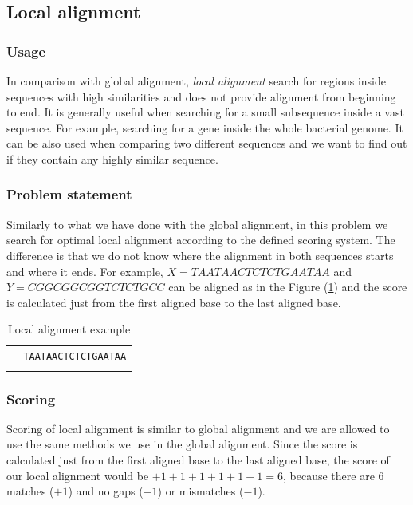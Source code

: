 \subsection{Local alignment}
\subsubsection{Usage}
In comparison with global alignment, \emph{local alignment} search for regions inside sequences with high similarities and does not provide alignment from beginning to end.
It is generally useful when searching for a small subsequence inside a vast sequence.
For example, searching for a gene inside the whole bacterial genome.
It can be also used when comparing two different sequences and we want to find out if they contain any highly similar sequence.

\subsubsection{Problem statement}
Similarly to what we have done with the global alignment, in this problem we search for optimal local alignment according to the defined scoring system.
The difference is that we do not know where the alignment in both sequences starts and where it ends.
For example, $ X = TAATAACTCTCTGAATAA $ and $ Y = CGGCGGCGGTCTCTGCC $ can be aligned as in the Figure (\ref{tab:loal}) and the score is calculated just from the first aligned base to the last aligned base.

\begin{table}
  \centering
	\begin{tabular}{ c }
	\verb|--TAATAACTCTCTGAATAA| \\
	\verb%     	|||||| 	% \\
	\verb|CGGCGGCGGTCTCTGCC---| \\
	\end{tabular}
  \caption{Local alignment example}
  \label{tab:loal}
\end{table}

\subsubsection{Scoring}
Scoring of local alignment is similar to global alignment and we are allowed to use the same methods we use in the global alignment.
Since the score is calculated just from the first aligned base to the last aligned base, the score of our local alignment would be $+1+1+1+1+1+1 = 6$, because there are 6 matches ($+1$) and no gaps ($-1$) or mismatches ($-1$).


